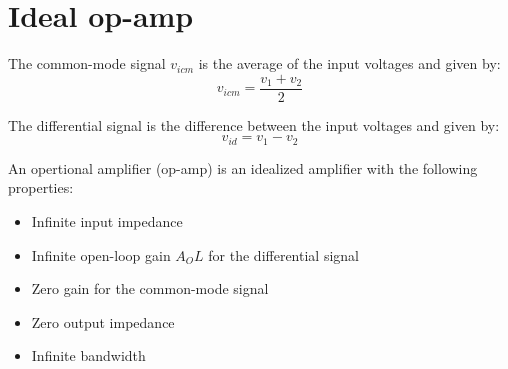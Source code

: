 \section{Ideal op-amp}

The common-mode signal $v_{icm}$ is the average of the input voltages and given by:
$$v_{icm} = \frac{v_1 + v_2}{2}$$

The differential signal is the difference between the input voltages and given by:
$$v_{id} = v_1 - v_2$$

An opertional amplifier (op-amp) is an idealized amplifier with the following properties:
\begin{itemize}
	\item{Infinite input impedance}
	\item{Infinite open-loop gain $A_OL$ for the differential signal}
	\item{Zero gain for the common-mode signal}
	\item{Zero output impedance}
	\item{Infinite bandwidth}
\end{itemize}


